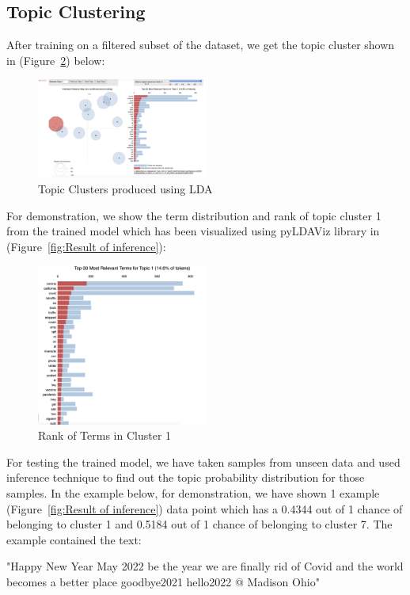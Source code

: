 \subsection{Topic Clustering}
After training on a filtered subset of the dataset, we get the topic cluster shown in (Figure~\ref{fig:Rank of Terms}) below: 
    \begin{figure}[H]
        \centering
        \includegraphics[width=0.5\textwidth]{imgs/cluster_topics.png}
        \caption{\label{fig:Topic Clusters}Topic Clusters produced using LDA}
        \label{fig:lda_topic}
    \end{figure}
For demonstration, we show the term distribution and rank of topic cluster 1
from the trained model which has been visualized using pyLDAViz library in
(Figure~\ref{fig:Result of inference}):
\begin{figure}[H]
    \centering
    \includegraphics[width=0.5\textwidth]{imgs/term_ranks.png}
    \caption{\label{fig:Rank of Terms}Rank of Terms in Cluster 1}
\end{figure}
For testing the trained model, we have taken samples from unseen data and used
inference technique to find out the topic probability distribution for those
samples. In the example below, for demonstration, we have shown 1 example
(Figure~\ref{fig:Result of inference}) data point which has a 0.4344 out of 1 chance of belonging to
cluster 1 and 0.5184 out of 1 chance of belonging to cluster 7. The example
contained the text: 
\begin{displayquote}
"Happy New Year May 2022 be the year we are finally rid of Covid and the world
 becomes a better place goodbye2021 hello2022 @ Madison Ohio"
\end{displayquote}

